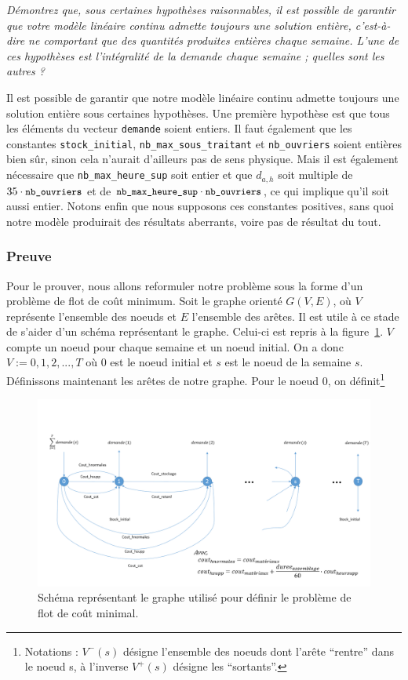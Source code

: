 \question %
\emph{Démontrez que, sous certaines hypothèses raisonnables, 
il est possible de garantir que votre modèle linéaire continu admette toujours
une solution entière, c'est-à-dire ne comportant que des quantités produites
entières chaque semaine. 
L'une de ces hypothèses est l'intégralité de la demande chaque semaine ; 
quelles sont les autres ?}

Il est possible de garantir que notre modèle linéaire continu
admette toujours une solution entière sous certaines hypothèses.
Une première hypothèse est que tous les éléments du 
vecteur \texttt{demande} soient entiers.
Il faut également que les constantes \texttt{stock\_initial}, \texttt{nb\_max\_sous\_traitant} et 
\texttt{nb\_ouvriers} soient entières bien sûr, sinon cela n'aurait d'ailleurs pas de sens physique.
Mais il est également nécessaire que \texttt{nb\_max\_heure\_sup} soit entier et que $d_{a,h}$ soit multiple de $35\cdot {\small\texttt{nb\_ouvriers}}$ et de ${\small\texttt{nb\_max\_heure\_sup}}\cdot{\small\texttt{nb\_ouvriers}}$, ce qui implique qu'il soit aussi entier.
Notons enfin que nous supposons ces constantes positives, sans quoi notre modèle produirait des résultats aberrants,
voire pas de résultat du tout.

\subsubsection*{Preuve}
Pour le prouver, nous allons reformuler notre problème sous la forme d'un problème de flot de coût minimum.
Soit le graphe orienté $G(V,E)$, 
où $V$ représente l'ensemble des noeuds et $E$ l'ensemble des arêtes.
Il est utile à ce stade de s'aider d'un schéma représentant le graphe. 
Celui-ci est repris à la figure~\ref{fig:schemaFlot}.
$V$ compte un noeud pour chaque semaine et un noeud initial.
On a donc $V := {0, 1, 2, ..., T}$
où $0$ est le noeud initial et $s$ est le noeud de la semaine $s$.
Définissons maintenant les arêtes de notre graphe.
Pour le noeud $0$, on définit\footnote{Notations : $V^{-}(s)$ désigne l'ensemble des noeuds dont l'arête ``rentre'' dans le noeud s, à l'inverse $V^{+}(s)$ désigne les ``sortants''.}

\begin{figure}[h]
	\centering
		\includegraphics[scale = 0.7, angle = 90]{img/Schema_flot.png}
	\caption{Schéma représentant le graphe utilisé pour définir 
  le problème de flot de coût minimal.}
	\label{fig:schemaFlot}
\end{figure}


